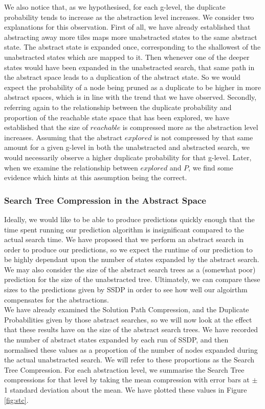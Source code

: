 \documentclass{article}
\begin{document}
We also notice that, as we hypothesised, for each g-level, the duplicate probability tends to increase as the abstraction level increases.
We consider two explanations for this observation.
First of all, we have already established that abstracting away more tiles
maps more unabstracted states to the same abstract state.
The abstract state is expanded once, corresponding to the shallowest of the unabstracted states
which are mapped to it.
Then whenever one of the deeper states would have been expanded in the unabstracted search,
that same path in the abstract space leads to a duplication of the abstract state.
So we would expect the probability of a node being pruned as a duplicate to be higher
in more abstract spaces, which is in line with the trend that we have observed.
Secondly, referring again to the relationship between the duplicate probability and proportion of the reachable state
space that has been explored, we have established that the size of \(reachable\) is compressed more as the abstraction level increases.
Assuming that the abstract \(explored\) is not compressed by that same amount for a given g-level in both the unabstracted and abstracted search,
we would necessarily observe a higher duplicate probability for that g-level.
Later, when we examine the relationship between \(explored\) and \(P\), we find some evidence which hints at this assumption
being the correct. \\

\subsubsection*{Search Tree Compression in the Abstract Space}

Ideally, we would like to be able to produce predictions quickly
enough that the time spent running our prediction algorithm is insignificant
compared to the actual search time.
We have proposed that we perform an abstract search in order to produce our predictions,
so we expect the runtime of our prediction to be highly dependant upon
the number of states expanded by the abstract search.
We may also consider the size of the abstract search trees
as a (somewhat poor) prediction for the size of the unabstracted tree.
Ultimately, we can compare these sizes to the predictions given by SSDP
in order to see how well our algoirthm compensates for the abstractions. \\

We have already examined the Solution Path Compression,
and the Duplicate Probabilities given by those abstract searches,
so we will now look at the effect that these results
have on the size of the abstract search trees.
We have recorded the number of abstract states expanded by each run of SSDP,
and then normalised these values as a proportion of the
number of nodes expanded during the actual unabstracted search.
We will refer to these proportions as the Search Tree Compression.
For each abstraction level, we summarise the Search Tree compressions for that level by taking the mean
compression
with error bars at
\(\pm\) 1 standard deviation about the mean.
We have plotted these values in Figure \ref{fig:stc}. \\
\end{document}

